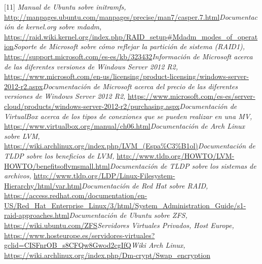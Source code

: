 [11] \textit{Manual de Ubuntu sobre initramfs, }
\url{http://manpages.ubuntu.com/manpages/precise/man7/casper.7.html}\newline
[12] \textit{Documentación de kernel.org sobre mdadm, }
\url{https://raid.wiki.kernel.org/index.php/RAID_setup#Mdadm_modes_of_operation}\newline
[13] \textit{Soporte de Microsoft sobre cómo reflejar la partición de sistema (RAID1), }
\url{https://support.microsoft.com/es-es/kb/323432}\newline
[14] \textit{Información de Microsoft acerca de las diferentes versiones de Windows Server 2012 R2, }
\url{https://www.microsoft.com/en-us/licensing/product-licensing/windows-server-2012-r2.aspx}\newline
[15] \textit{Documentación de Microsoft acerca del precio de las diferentes versiones de Windows Server 2012 R2, }
\url{https://www.microsoft.com/es-es/server-cloud/products/windows-server-2012-r2/purchasing.aspx}\newline
[16] \textit{Documentación de VirtualBox acerca de los tipos de conexiones que se pueden realizar en una MV, }
\url{https://www.virtualbox.org/manual/ch06.html}\newline
[17] \textit{Documentación de Arch Linux sobre LVM, }
\url{https://wiki.archlinux.org/index.php/LVM_(Espa%C3%B1ol)}\newline
[18] \textit{Documentación de TLDP sobre los beneficios de LVM, }
\url{http://www.tldp.org/HOWTO/LVM-HOWTO/benefitsoflvmsmall.html}\newline
[19] \textit{Documentación de TLDP sobre los sistemas de archivos, }
\url{http://www.tldp.org/LDP/Linux-Filesystem-Hierarchy/html/var.html}\newline
[20] \textit{Documentación de Red Hat sobre RAID, }
\url{https://access.redhat.com/documentation/en-US/Red_Hat_Enterprise_Linux/3/html/System_Administration_Guide/s1-raid-approaches.html}\newline
[21] \textit{Documentación de Ubuntu sobre ZFS, }
\url{https://wiki.ubuntu.com/ZFS}\newline
[22] \textit{Servidores Virtuales Privados, Host Europe, }
\url{https://www.hosteurope.es/servidores-virtuales?gclid=CISFnrOB_s8CFQw8Gwod2cgIfQ}\newline
[23] \textit{Wiki Arch Linux, }
\url{https://wiki.archlinux.org/index.php/Dm-crypt/Swap_encryption}


